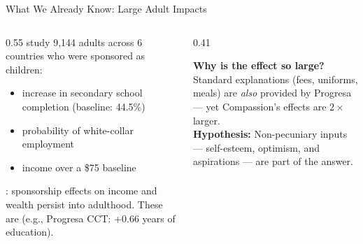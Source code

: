 \documentclass[aspectratio=169, 10pt]{beamer}
\begin{document}
\begin{frame}{What We Already Know: Large Adult Impacts}
  \begin{columns}
    \begin{column}{0.55\textwidth}
      \citealt{Wydick2013} study 9,144 adults across 6 countries who were sponsored as children:
      \begin{itemize}
        \item {} increase in secondary school completion (baseline: 44.5\%)
        \item {} probability of white-collar employment
        \item {} income over a \$75 baseline
      \end{itemize}
      \vspace{0.5em}
      \citealt{Wydick2017}: sponsorship effects on income and wealth persist into adulthood.
      \vspace{0.5em}
      These are  (e.g., Progresa CCT: +0.66 years of education).
    \end{column}
    \begin{column}{0.41\textwidth}
      \begin{methodbox}
        \textbf{Why is the effect so large?}\\[0.4em]
        Standard explanations (fees, uniforms, meals) are \emph{also} provided by Progresa --- yet Compassion's effects are $2\times$ larger.\\[0.5em]
        \textbf{Hypothesis:} Non-pecuniary inputs --- self-esteem, optimism, and aspirations --- are part of the answer.
      \end{methodbox}
    \end{column}
  \end{columns}
\end{frame}
\end{document}
